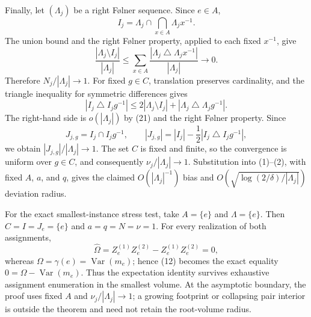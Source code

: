Finally, let \((\Lambda_j)\) be a right F\o lner sequence.  Since \(e\in A\),
\[
 I_j=\Lambda_j\cap\bigcap_{x\in A}\Lambda_jx^{-1}.
\]
The union bound and the right F\o lner property, applied to each fixed \(x^{-1}\), give
\[
 \frac{|\Lambda_j\setminus I_j|}{|\Lambda_j|}
 \le\sum_{x\in A}
 \frac{|\Lambda_j\mathbin\triangle\Lambda_jx^{-1}|}{|\Lambda_j|}
 \longrightarrow0. \tag{21}
\]
Therefore \(N_j/|\Lambda_j|\to1\).  For fixed \(g\in C\), translation preserves cardinality, and the triangle inequality for symmetric differences gives
\[
 |I_j\mathbin\triangle I_jg^{-1}|
 \le2|\Lambda_j\setminus I_j|
   +|\Lambda_j\mathbin\triangle\Lambda_jg^{-1}|. \tag{22}
\]
The right-hand side is \(o(|\Lambda_j|)\) by (21) and the right F\o lner property.  Since
\[
 J_{j,g}=I_j\cap I_jg^{-1},
 \qquad
 |J_{j,g}|=|I_j|-\frac12|I_j\mathbin\triangle I_jg^{-1}|,
\]
we obtain \(|J_{j,g}|/|\Lambda_j|\to1\).  The set \(C\) is fixed and finite, so the convergence is uniform over \(g\in C\), and consequently \(\nu_j/|\Lambda_j|\to1\).  Substitution into (1)--(2), with fixed \(A\), \(a\), and \(q\), gives the claimed \(O(|\Lambda_j|^{-1})\) bias and \(O(\sqrt{\log(2/\delta)/|\Lambda_j|})\) deviation radius.

For the exact smallest-instance stress test, take \(A=\{e\}\) and \(\Lambda=\{e\}\).  Then \(C=I=J_e=\{e\}\) and \(a=q=N=\nu=1\).  For every realization of both assignments,
\[
 \widehat\Omega
 =Z_e^{(1)}Z_e^{(2)}
  -Z_e^{(1)}Z_e^{(2)}=0,
\]
whereas \(\Omega=\gamma(e)=\operatorname{Var}(m_e)\); hence (12) becomes the exact equality \(0=\Omega-\operatorname{Var}(m_e)\).  Thus the expectation identity survives exhaustive assignment enumeration in the smallest volume.  At the asymptotic boundary, the proof uses fixed \(A\) and \(\nu_j/|\Lambda_j|\to1\); a growing footprint or collapsing pair interior is outside the theorem and need not retain the root-volume radius.
